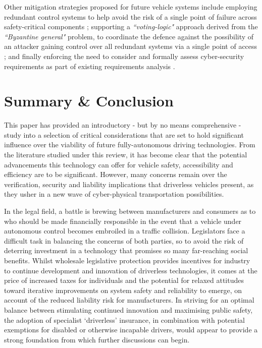 \documentclass[conference]{IEEEtran}
\begin{document}
Other mitigation strategies proposed for future vehicle systems include employing redundant control systems to help avoid the risk of a single point of failure across safety-critical components \cite{yagdereli, kpmg}; supporting a \textit{``voting-logic"} approach derived from the \textit{``Byzantine general"} problem, to coordinate the defence against the possibility of an attacker gaining control over all redundant systems via a single point of access \cite{yagdereli}; and finally enforcing the need to consider and formally assess cyber-security requirements as part of existing requirements analysis \cite{valasek-1, yagdereli}.


\section{Summary \& Conclusion}

This paper has provided an introductory - but by no means comprehensive - study into a selection of critical considerations that are set to hold significant influence over the viability of future fully-autonomous driving technologies. From the literature studied under this review, it has become clear that the potential advancements this technology can offer for vehicle safety, accessibility and efficiency are to be significant. However, many concerns remain over the verification, security and liability implications that driverless vehicles present, as they usher in a new wave of cyber-physical transportation possibilities.

In the legal field, a battle is brewing between manufacturers and consumers as to who should be made financially responsible in the event that a vehicle under autonomous control becomes embroiled in a traffic collision. Legislators face a difficult task in balancing the concerns of both parties, so to avoid the risk of deterring investment in a technology that promises so many far-reaching social benefits. Whilst wholesale legislative protection provides incentives for industry to continue development and innovation of driverless technologies, it comes at the price of increased taxes for individuals and the potential for relaxed attitudes toward iterative improvements on system safety and reliability to emerge, on account of the reduced liability risk for manufacturers. In striving for an optimal balance between stimulating continued innovation and maximising public safety, the adoption of specialist `driverless' insurance, in combination with potential exemptions for disabled or otherwise incapable drivers, would appear to provide a strong foundation from which further discussions can begin. 
\end{document}
